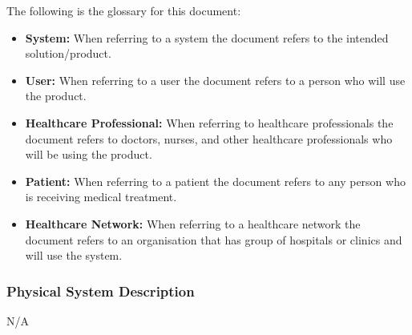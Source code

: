 \documentclass[12pt]{article}
\begin{document}
The following is the glossary for this document:

\begin{itemize}
  \item \textbf{System:} When referring to a system the document refers to the intended solution/product.
  \item \textbf{User:} When referring to a user the document refers to a person who will use the product.
  \item \textbf{Healthcare Professional:} When referring to healthcare professionals the document refers to doctors, nurses, and other healthcare professionals who will be using the product.
  \item \textbf{Patient:} When referring to a patient the document refers to any person who is receiving medical treatment.
  \item \textbf{Healthcare Network:} When referring to a healthcare network the document refers to an organisation that has group of hospitals or clinics and will use the system.
\end{itemize}


\subsubsection{Physical System Description} \label{sec_phySystDescrip}
N/A
\end{document}

